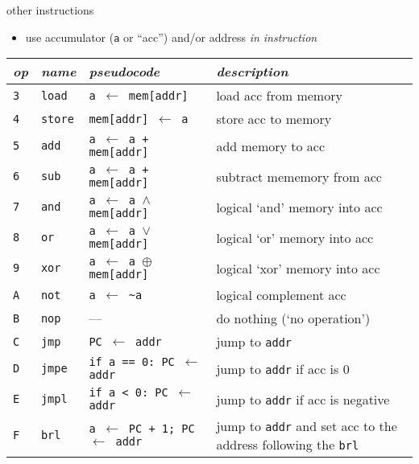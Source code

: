 \begin{frame}{other instructions}
    \vspace{-.5cm}
    \begin{itemize}
        \item use accumulator ({\tt a} or ``acc'') and/or address \textit{in instruction}
    \end{itemize}
    \small
    \begin{tabular}{l|l|l|p{6cm}}
        \textit{op} & \textit{name} &  \textit{pseudocode} & \textit{description} \\ \hline
        {\tt 3} & {\tt load} & {\tt a $\leftarrow$ mem[addr]} & load acc from memory\\ \hline
        {\tt 4} & {\tt store} & {\tt mem[addr] $\leftarrow$ a} & store acc to memory \\ \hline
        {\tt 5} & {\tt add} & {\tt a $\leftarrow$ a + mem[addr]} & add memory to acc \\ \hline
        {\tt 6} & {\tt sub} & {\tt a $\leftarrow$ a + mem[addr]} & subtract mememory from acc \\ \hline
        {\tt 7} & {\tt and} & {\tt a $\leftarrow$ a $\wedge$ mem[addr]} & logical `and' memory into acc \\ \hline
        {\tt 8} & {\tt or} & {\tt a $\leftarrow$ a $\vee$ mem[addr]} & logical `or' memory into acc \\ \hline
        {\tt 9} & {\tt xor} & {\tt a $\leftarrow$ a $\oplus$ mem[addr]} & logical `xor' memory into acc \\ \hline
        {\tt A} & {\tt not} & {\tt a $\leftarrow$ \textasciitilde a} & logical complement acc \\ \hline
        {\tt B} & {\tt nop} & --- & do nothing (`no operation') \\ \hline
        {\tt C} & {\tt jmp} & {\tt PC $\leftarrow$ addr} & jump to \texttt{addr} \\ \hline
        {\tt D} & {\tt jmpe} & {\tt if a == 0: PC $\leftarrow$ addr} & jump to \texttt{addr} if acc is 0 \\ \hline
        {\tt E} & {\tt jmpl} & {\tt if a < 0: PC $\leftarrow$ addr} & jump to \texttt{addr} if acc is negative \\ \hline
        {\tt F} & {\tt brl} & {\tt a $\leftarrow$ PC + 1; PC $\leftarrow$ addr} & jump to \texttt{addr} and set acc to
                                                             the address following the {\tt brl} \\ \hline
    \end{tabular}
\end{frame}

